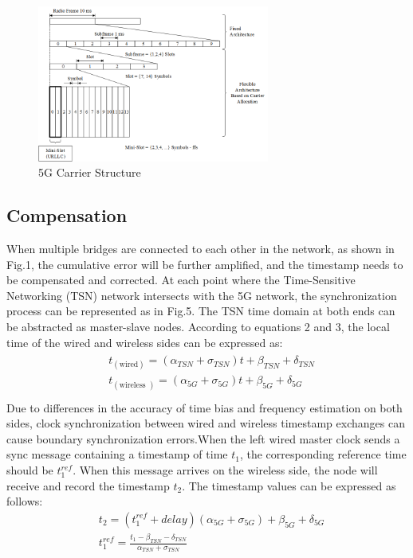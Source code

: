 \documentclass[english]{cccconf}
\begin{document}
\begin{figure}[htbp]
	\centering
	\setcounter{figure}{4}
	\includegraphics[width=3in]{fig14.png}
	\caption{5G Carrier Structure}
\end{figure}
\subsection{Compensation}
When multiple bridges are connected to each other in the network, as shown in Fig.1, the cumulative error will be further amplified, and the timestamp needs to be compensated and corrected. At each point where the Time-Sensitive Networking (TSN) network intersects with the 5G network, the synchronization process can be represented as in Fig.5. The TSN time domain at both ends can be abstracted as master-slave nodes. According to equations 2 and 3, the local time of the wired and wireless sides can be expressed as:
\begin{eqnarray}
	\begin{aligned}
		&t_{(\text {wired})}=\left(\alpha_{TSN}+\sigma_{TSN}\right) t+\beta_{TSN}+\delta_{TSN}\\
		&t_{(\text {wireless })}=\left(\alpha_{5G}+\sigma_{5G}\right) t+\beta_{5G}+\delta_{5G}\\
	\end{aligned}
\end{eqnarray}
Due to differences in the accuracy of time bias and frequency estimation on both sides, clock synchronization between wired and wireless timestamp exchanges can cause boundary synchronization errors.When the left wired master clock sends a sync message containing a timestamp of time $t_1$, the corresponding reference time should be $t_1^{ref}$. When this message arrives on the wireless side, the node will receive and record the timestamp $t_2$. The timestamp values can be expressed as follows:
\begin{equation}
	\begin{split}
		&t_{2}=(t_1^{ref}+delay)(\alpha_{5G}+\sigma_{5G})+\beta_{5G}+\delta_{5G} \\
		&t_1^{ref}=\frac{t_{1}-\beta_{TSN}-\delta_{TSN}}{\alpha_{TSN}+\sigma_{TSN}}
	\end{split}
\end{equation}
\end{document}

